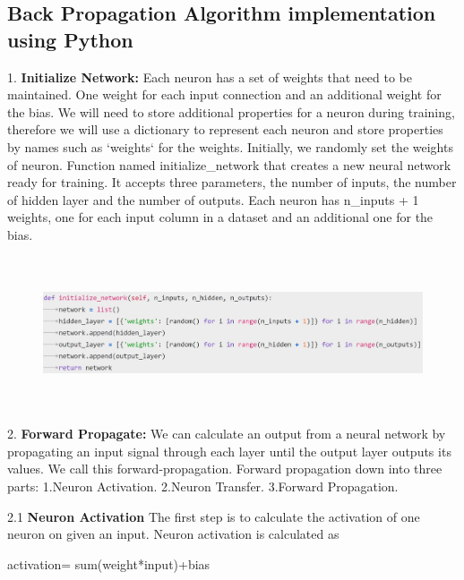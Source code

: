 \subsection{Back Propagation Algorithm implementation using Python}

1. \textbf{Initialize Network:}
Each neuron has a set of weights that need to be maintained. One weight for each input connection and an additional weight for the bias. We will need to store additional properties for a neuron during training, therefore we will use a dictionary to represent each neuron and store properties by names such as ‘weights‘ for the weights.
Initially, we randomly set the weights of neuron.\newline
Function named initialize\_network that creates a new neural network ready for training. It accepts three parameters, the number of inputs, the number of  hidden layer and the number of outputs.\newline
Each neuron  has n\_inputs + 1 weights, one for each input column in a dataset and an additional one for the bias.

\begin{figure}[H]
\begin{center}
\includegraphics[width=160mm,height=45mm]{backexplain/initializeNetwork.jpg}
\end{center}
\end{figure}

2. \textbf{Forward Propagate:}
We can calculate an output from a neural network by propagating an input signal through each layer until the output layer outputs its values.
We call this forward-propagation.\newline
Forward propagation down into three parts:\newline
    1.Neuron Activation.\newline
    2.Neuron Transfer.\newline
    3.Forward Propagation.\newline
    
2.1 \textbf{Neuron Activation}
The first step is to calculate the activation of one neuron on given an input.\newline
Neuron activation is calculated as\newline
           \centerline{activation= sum(weight*input)+bias }


